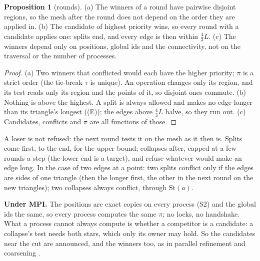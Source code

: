 \documentclass[10pt,a4paper]{article}
\theoremstyle{definition}
\newtheorem{proposition}{Proposition}
\begin{document}
\begin{proposition}[rounds]
  \label{prop:rounds}
  (a) The winners of a round have pairwise disjoint regions, so the mesh
  after the round does not depend on the order they are applied in.
  (b) The candidate of highest priority wins, so every round with a
  candidate applies one: splits end, and every edge is then within
  $\tfrac43 L$. (c) The winners depend only on positions, global ids and
  the connectivity, not on the traversal or the number of processes.
\end{proposition}
\begin{proof}
  (a) Two winners that conflicted would each have the higher priority;
  $\pi$ is a strict order (the tie-break $\tau$ is unique). An operation
  changes only its region, and its test reads only its region and the
  points of it, so disjoint ones commute. (b) Nothing is above the
  highest. A split is always allowed and makes no edge longer than its
  triangle's longest ((E)); the edges above $\tfrac43 L$ halve, so they
  run out. (c) Candidates, conflicts and $\pi$ are all functions of those.
\end{proof}

A loser is not refused: the next round tests it on the mesh as it then
is. Splits come first, to the end, for the upper bound; collapses after,
capped at a few rounds a step (the lower end is a target), and refuse
whatever would make an edge long. In the case of two edges at a point:
two splits conflict only if the edges are sides of one triangle (then the
longer first, the other in the next round on the new triangles); two
collapses always conflict, through $\mathrm{St}(a)$.

\textbf{Under MPI.} The positions are exact copies on every process (S2)
and the global ids the same, so every process computes the same $\pi$; no
locks, no handshake. What a process cannot always compute is whether a
competitor is a candidate: a collapse's test needs both stars, which only
its owner may hold. So the candidates near the cut are announced, and the
winners too, as in parallel refinement and coarsening \cite{decougny}.
\end{document}
